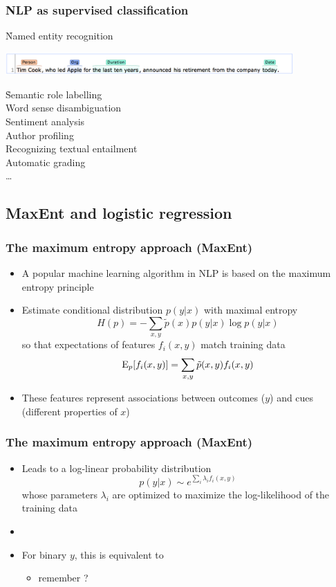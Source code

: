 \documentclass[t]{beamer} %
\begin{document}
\begin{frame}
  \frametitle{NLP as supervised classification}

  \h{Named entity recognition}
  \begin{center}\ungap[1]
    \includegraphics[width=11cm]{img/corenlp_ner}%
  \end{center}

  \gap[1]
  \h{Semantic role labelling\\
    Word sense disambiguation\\
    Sentiment analysis\\
    Author profiling\\
    Recognizing textual entailment\\
    Automatic grading\\
    \ldots}
\end{frame}

\subsection{MaxEnt and logistic regression}

\begin{frame}
  \frametitle{The maximum entropy approach (MaxEnt)}

  \begin{itemize}
  \item A popular machine learning algorithm in NLP is based on the maximum entropy principle \citep{Berger:DellaPietra:96}
  \item Estimate conditional distribution $p(y|x)$ with maximal entropy
    \[
      H(p) = -\sum_{x,y} \tilde{p}(x) p(y|x) \log p(y|x)
    \]
    so that expectations of features $f_i(x, y)$ match training data
    \[
      \Exp[p]{f_i(x, y)} = \sum_{x,y} \tilde{p}(x, y) f_i(x, y)
    \]
  \item<2->[\hand] These features represent associations between outcomes ($y$) and cues (different properties of $x$)
  \end{itemize}
\end{frame}

\begin{frame}
  \frametitle{The maximum entropy approach (MaxEnt)}

  \begin{itemize}
  \item Leads to a log-linear probability distribution
    \[
      p(y|x) \sim e^{\sum_i \lambda_i f_i(x, y)}
    \]
    whose parameters $\lambda_i$ are optimized to maximize the log-likelihood
    of the training data
  \item[]
  \item For binary $y$, this is equivalent to 
    \begin{itemize}
    \item remember \citet{Bresnan:etc:07}?
    \end{itemize}
  \end{itemize}
\end{frame}
\end{document}
